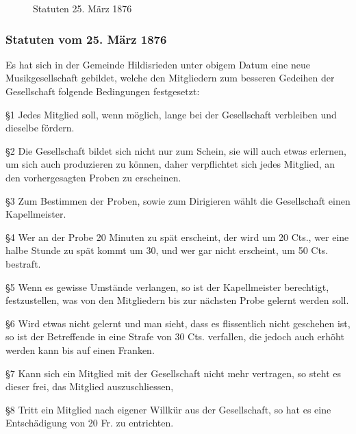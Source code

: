 
\begin{figure}[ht]
    \centering
    \hfil
    \caption{Statuten 25. März 1876}
    \label{fig:Statuten-1874}
\end{figure}

\begin{history}

    \subsubsection*{Statuten vom 25. März 1876}

    Es hat sich in der Gemeinde Hildisrieden unter obigem Datum eine neue
    Musikgesellschaft gebildet, welche den Mitgliedern zum besseren Gedeihen der
    Gesellschaft folgende Bedingungen festgesetzt:

    \S1 Jedes Mitglied soll, wenn möglich, lange bei der Gesellschaft verbleiben
    und dieselbe fördern.

    \S2 Die Gesellschaft bildet sich nicht nur zum Schein, sie will auch etwas
    erlernen, um sich auch produzieren zu können, daher verpflichtet sich jedes
    Mitglied, an den vorhergesagten Proben zu erscheinen.

    \S3 Zum Bestimmen der Proben, sowie zum Dirigieren wählt die Gesellschaft
    einen Kapellmeister.

    \S4 Wer an der Probe 20 Minuten zu spät erscheint, der wird um 20 Cts., wer
    eine halbe Stunde zu spät kommt um 30, und wer gar nicht erscheint, um 50
    Cts. bestraft.

    \S5 Wenn es gewisse Umstände verlangen, so ist der Kapellmeister berechtigt,
    festzustellen, was von den Mitgliedern bis zur nächsten Probe gelernt werden
    soll.

    \S6 Wird etwas nicht gelernt und man sieht, dass es flissentlich nicht
    geschehen ist, so ist der Betreffende in eine Strafe von 30 Cts. verfallen,
    die jedoch auch erhöht werden kann bis auf einen Franken.

    \S7 Kann sich ein Mitglied mit der Gesellschaft nicht mehr vertragen, so
    steht es dieser frei, das Mitglied auszuschliessen,

    \S8 Tritt ein Mitglied nach eigener Willkür aus der Gesellschaft, so hat es
    eine Entschädigung von 20 Fr. zu entrichten.


\end{history}
